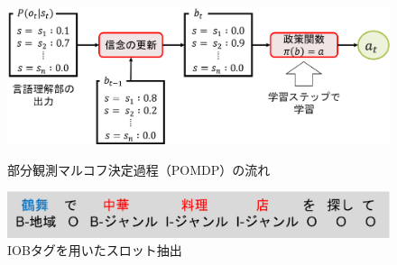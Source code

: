 \begin{figure}[thb]
  \centering
  \begin{minipage}{1.0\hsize}
    \begin{center}
      \includegraphics[width=15cm]{chapter2/pomdp.eps}
      \caption{部分観測マルコフ決定過程（POMDP）の流れ}
      \label{fig:pomdp}
      \hspace{1.6cm}
    \end{center}
  \end{minipage}
  \begin{minipage}{1.0\hsize}
    \begin{center}
      \includegraphics[width=15cm]{chapter2/crf.eps}
      \caption{IOBタグを用いたスロット抽出}
      \label{fig:crf}
    \end{center}
  \end{minipage}
\end{figure}

